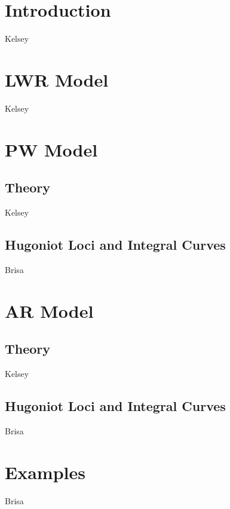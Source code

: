 \documentclass{article}
\begin{document}
\section{Introduction}
Kelsey
\section{LWR Model}
Kelsey
\section{PW Model}

\subsection{Theory}
Kelsey
\subsection{Hugoniot Loci and Integral Curves}
Brisa
\section{AR Model}

\subsection{Theory}
Kelsey
\subsection{Hugoniot Loci and Integral Curves}
Brisa

\section{Examples}
Brisa
\end{document}

